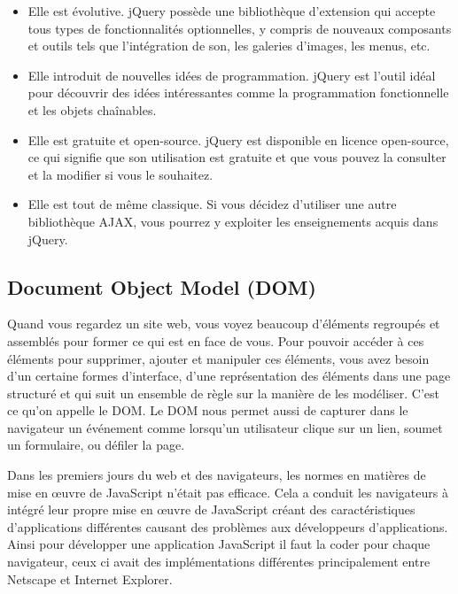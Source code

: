\begin{itemize}
    
    \item[\textbullet]
    Elle est évolutive. jQuery possède une bibliothèque d'extension qui accepte tous types de fonctionnalités optionnelles, y compris de nouveaux composants et outils tels que l'intégration de son, les galeries d'images, les menus, etc.
    
    \item[\textbullet]
    Elle introduit de nouvelles idées de programmation. jQuery est l'outil idéal pour découvrir des idées intéressantes comme la programmation fonctionnelle et les objets chaînables.
    
    \item[\textbullet]
    Elle est gratuite et open-source. jQuery est disponible en licence open-source, ce qui signifie que son utilisation est gratuite et que vous pouvez la consulter et la modifier si vous le souhaitez.
    
    \item[\textbullet]
    Elle est tout de même classique. Si vous décidez d'utiliser une autre bibliothèque AJAX, vous pourrez y exploiter les enseignements acquis dans jQuery.

\end{itemize}

\subsection{Document Object Model (DOM) }

Quand vous regardez un site web, vous voyez beaucoup d'éléments regroupés et assemblés pour former ce qui est en face de vous. Pour pouvoir accéder à ces éléments pour supprimer, ajouter et manipuler ces éléments, vous avez besoin d'un certaine formes d'interface, d'une représentation des éléments dans une page structuré et qui suit un ensemble de règle sur la manière de les modéliser. C'est ce qu'on appelle le DOM. Le DOM nous permet aussi de capturer dans le navigateur un événement comme lorsqu'un utilisateur clique sur un lien, soumet un formulaire, ou défiler la page.

Dans les premiers jours du web et des navigateurs, les normes en matières de mise en œuvre de JavaScript n'était pas efficace. Cela a conduit les navigateurs à intégré leur propre mise en œuvre de JavaScript créant des caractéristiques d'applications différentes causant des problèmes aux développeurs d'applications.
Ainsi pour développer une application JavaScript il  faut la coder pour chaque navigateur, ceux ci avait des implémentations différentes principalement entre Netscape et Internet Explorer.

